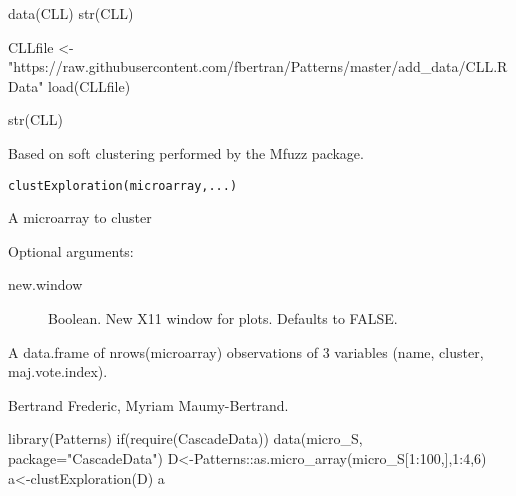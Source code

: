 \documentclass[a4paper]{book}
\begin{document}
%
\begin{Examples}
\begin{ExampleCode}
data(CLL)
str(CLL)


CLLfile <- "https://raw.githubusercontent.com/fbertran/Patterns/master/add_data/CLL.RData"
load(CLLfile)

str(CLL)

\end{ExampleCode}
\end{Examples}
%
\begin{Description}\relax
Based on soft clustering performed by the Mfuzz package.
\end{Description}
%
\begin{Usage}
\begin{verbatim}
clustExploration(microarray,...)
\end{verbatim}
\end{Usage}
%
\begin{Arguments}
\begin{ldescription}
\item[\code{microarray}] A microarray to cluster
\item[\code{...}] 
Optional arguments: 	  	
\begin{description}
 
\item[new.window] Boolean. New X11 window for plots. Defaults to FALSE.

\end{description}


\end{ldescription}
\end{Arguments}
%
\begin{Value}
A data.frame of nrows(microarray) observations of 3 variables (name, cluster, maj.vote.index).
\end{Value}
%
\begin{Author}\relax
Bertrand Frederic, Myriam Maumy-Bertrand.
\end{Author}
%
\begin{Examples}
\begin{ExampleCode}
library(Patterns)
if(require(CascadeData)){
data(micro_S, package="CascadeData")
D<-Patterns::as.micro_array(micro_S[1:100,],1:4,6)
a<-clustExploration(D)
a
}
\end{ExampleCode}
\end{Examples}
\end{document}
